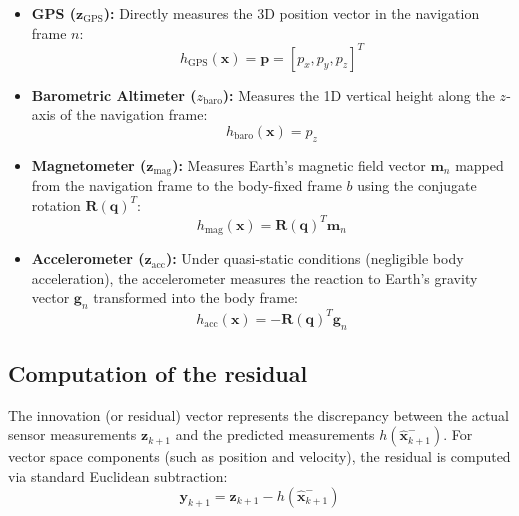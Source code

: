 \documentclass{article}
\begin{document}
	\begin{itemize}
		\item \textbf{GPS ($\mathbf{z}_{\text{GPS}}$):} Directly measures the 3D position vector in the navigation frame $n$:
		\begin{equation}
			h_{\text{GPS}}(\mathbf{x}) = \mathbf{p} = [p_x, p_y, p_z]^T
		\end{equation}
		
		\item \textbf{Barometric Altimeter ($z_{\text{baro}}$):} Measures the 1D vertical height along the $z$-axis of the navigation frame:
		\begin{equation}
			h_{\text{baro}}(\mathbf{x}) = p_z
		\end{equation}
		
		\item \textbf{Magnetometer ($\mathbf{z}_{\text{mag}}$):} Measures Earth's magnetic field vector $\mathbf{m}_n$ mapped from the navigation frame to the body-fixed frame $b$ using the conjugate rotation $\mathbf{R}(\mathbf{q})^T$:
		\begin{equation}
			h_{\text{mag}}(\mathbf{x}) = \mathbf{R}(\mathbf{q})^T \mathbf{m}_n
		\end{equation}
		
		\item \textbf{Accelerometer ($\mathbf{z}_{\text{acc}}$):} Under quasi-static conditions (negligible body acceleration), the accelerometer measures the reaction to Earth's gravity vector $\mathbf{g}_n$ transformed into the body frame:
		\begin{equation}
			h_{\text{acc}}(\mathbf{x}) = -\mathbf{R}(\mathbf{q})^T \mathbf{g}_n
		\end{equation}
	\end{itemize}
	
	\subsection{Computation of the residual}
	
	The innovation (or residual) vector represents the discrepancy between the actual sensor measurements $\mathbf{z}_{k+1}$ and the predicted measurements $h(\hat{\mathbf{x}}_{k+1}^-)$. For vector space components (such as position and velocity), the residual is computed via standard Euclidean subtraction:
	\begin{equation}
		\mathbf{y}_{k+1} = \mathbf{z}_{k+1} - h(\hat{\mathbf{x}}_{k+1}^-)
	\end{equation}
	
\end{document}
